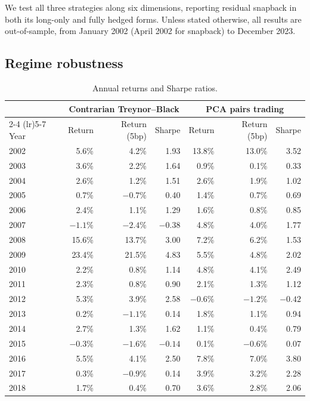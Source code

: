 \documentclass[11pt]{article}
\begin{document}
We test all three strategies along six dimensions, reporting residual snapback in both its long-only and fully hedged forms. Unless stated otherwise, all results are out-of-sample, from January 2002 (April 2002 for snapback) to December 2023.

\subsection{Regime robustness}

\begin{table}[H]
\centering
\caption{Annual returns and Sharpe ratios.}
\label{tab:yearly}
\begin{tabular}{lrrrrrr}
\toprule
& \multicolumn{3}{c}{Contrarian Treynor--Black} & \multicolumn{3}{c}{PCA pairs trading} \\
\cmidrule(lr){2-4} \cmidrule(lr){5-7}
Year & Return & Return (5bp) & Sharpe & Return & Return (5bp) & Sharpe \\
\midrule
2002 & 5.6\% & 4.2\% & 1.93 & 13.8\% & 13.0\% & 3.52 \\
2003 & 3.6\% & 2.2\% & 1.64 & 0.9\% & 0.1\% & 0.33 \\
2004 & 2.6\% & 1.2\% & 1.51 & 2.6\% & 1.9\% & 1.02 \\
2005 & 0.7\% & $-0.7\%$ & 0.40 & 1.4\% & 0.7\% & 0.69 \\
2006 & 2.4\% & 1.1\% & 1.29 & 1.6\% & 0.8\% & 0.85 \\
2007 & $-1.1\%$ & $-2.4\%$ & $-0.38$ & 4.8\% & 4.0\% & 1.77 \\
2008 & 15.6\% & 13.7\% & 3.00 & 7.2\% & 6.2\% & 1.53 \\
2009 & 23.4\% & 21.5\% & 4.83 & 5.5\% & 4.8\% & 2.02 \\
2010 & 2.2\% & 0.8\% & 1.14 & 4.8\% & 4.1\% & 2.49 \\
2011 & 2.3\% & 0.8\% & 0.90 & 2.1\% & 1.3\% & 1.12 \\
2012 & 5.3\% & 3.9\% & 2.58 & $-0.6\%$ & $-1.2\%$ & $-0.42$ \\
2013 & 0.2\% & $-1.1\%$ & 0.14 & 1.8\% & 1.1\% & 0.94 \\
2014 & 2.7\% & 1.3\% & 1.62 & 1.1\% & 0.4\% & 0.79 \\
2015 & $-0.3\%$ & $-1.6\%$ & $-0.14$ & 0.1\% & $-0.6\%$ & 0.07 \\
2016 & 5.5\% & 4.1\% & 2.50 & 7.8\% & 7.0\% & 3.80 \\
2017 & 0.3\% & $-0.9\%$ & 0.14 & 3.9\% & 3.2\% & 2.28 \\
2018 & 1.7\% & 0.4\% & 0.70 & 3.6\% & 2.8\% & 2.06 \\

\end{tabular}
\end{table}
\end{document}
